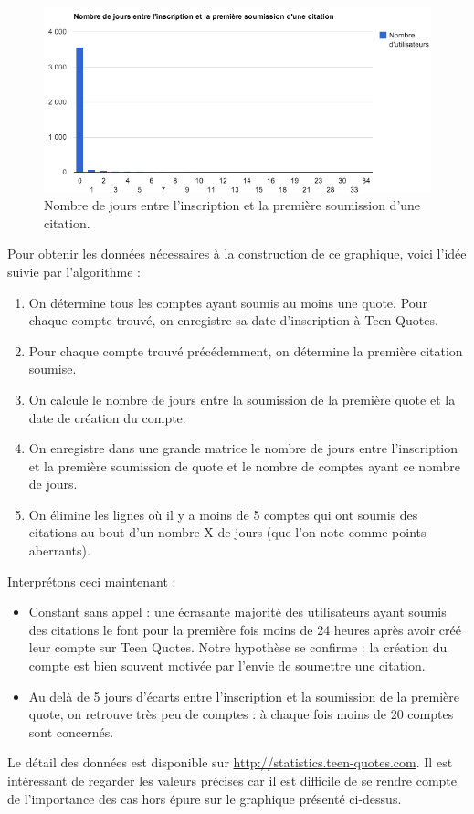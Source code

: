 \documentclass{report}
\begin{document}
	\begin{figure}[H]
		\center
		\includegraphics[width=450px]{images/inscriptionSoumissionQuote.png}
		\caption{Nombre de jours entre l'inscription et la première soumission d'une citation.}
	\end{figure}
	Pour obtenir les données nécessaires à la construction de ce graphique, voici l'idée suivie par l'algorithme :
	\vspace{10px}
	\begin{enumerate}
		\item On détermine tous les comptes ayant soumis au moins une quote. Pour chaque compte trouvé, on enregistre sa date d'inscription à Teen Quotes.
		\item Pour chaque compte trouvé précédemment, on détermine la première citation soumise.
		\item On calcule le nombre de jours entre la soumission de la première quote et la date de création du compte.
		\item On enregistre dans une grande matrice le nombre de jours entre l'inscription et la première soumission de quote et le nombre de comptes ayant ce nombre de jours.
		\item On élimine les lignes où il y a moins de 5 comptes qui ont soumis des citations au bout d'un nombre X de jours (que l'on note comme points aberrants).
	\end{enumerate}
	\vspace{10px}
	Interprétons ceci maintenant :
	\vspace{10px}
	\begin{itemize}
		\item Constant sans appel : une écrasante majorité des utilisateurs ayant soumis des citations le font pour la première fois moins de 24 heures après avoir créé leur compte sur Teen Quotes. Notre hypothèse se confirme : la création du compte est bien souvent motivée par l'envie de soumettre une citation.
		\item Au delà de 5 jours d'écarts entre l'inscription et la soumission de la première quote, on retrouve très peu de comptes : à chaque fois moins de 20 comptes sont concernés.  
	\end{itemize}
	\vspace{10px}
	Le détail des données est disponible sur \url{http://statistics.teen-quotes.com}. Il est intéressant de regarder les valeurs précises car il est difficile de se rendre compte de l'importance des cas hors épure sur le graphique présenté ci-dessus.
\end{document}
